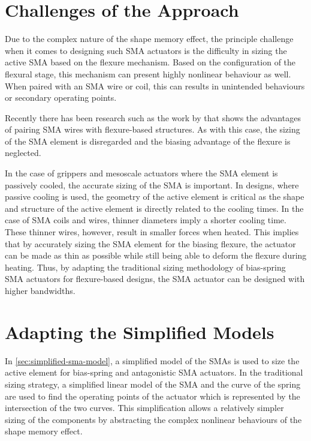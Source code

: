 \section{Challenges of the Approach}
Due to the complex nature of the shape memory effect, the principle challenge when it comes to designing such SMA actuators is the difficulty in sizing the active SMA based on the flexure mechanism. Based on the configuration of the flexural stage, this mechanism can present highly nonlinear behaviour as well. When paired with an SMA wire or coil, this can results in unintended behaviours or secondary operating points.

Recently there has been research such as the work by \cite{maffiodoThreeFingeredGripperFlexure2017} that shows the advantages of pairing SMA wires with flexure-based structures. As with this case, the sizing of the SMA element is disregarded and the biasing advantage of the flexure is neglected.

In the case of grippers and mesoscale actuators where the SMA element is passively cooled, the accurate sizing of the SMA is important. In designs, where passive cooling is used, the geometry of the active element is critical as the shape and structure of the active element is directly related to the cooling times. In the case of SMA coils and wires, thinner diameters imply a shorter cooling time. These thinner wires, however, result in smaller forces when heated. This implies that by accurately sizing the SMA element for the biasing flexure, the actuator can be made as thin as possible while still being able to deform the flexure during heating. Thus, by adapting the traditional sizing methodology of bias-spring SMA actuators for flexure-based designs, the SMA actuator can be designed with higher bandwidths.

\section{Adapting the Simplified Models}\label{sec:bias-compliant-methodology}
In \cref{sec:simplified-sma-model}, a simplified model of the SMAs is used to size the active element for bias-spring and antagonistic SMA actuators. In the traditional sizing strategy, a simplified linear model of the SMA and the curve of the spring are used to find the operating points of the actuator which is represented by the intersection of the two curves. This simplification allows a relatively simpler sizing of the components by abstracting the complex nonlinear behaviours of the shape memory effect.

